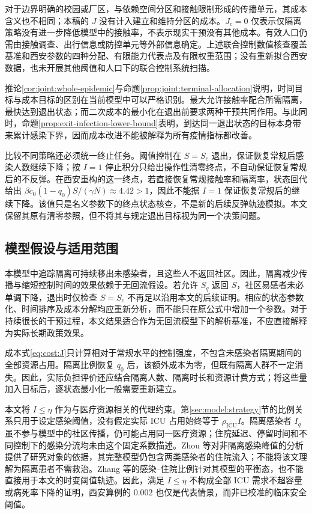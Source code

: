 \documentclass[lang=cn,a4paper,newtx]{elegantpaper}
\numberwithin{equation}{section}
\theoremstyle{plain}
\begin{document}
对于边界明确的校园或厂区，与依赖空间分区和接触限制形成的传播单元，其成本含义也不相同；本稿的 $J$ 没有计入建立和维持分区的成本。$J_c=0$ 仅表示仅隔离策略没有进一步降低模型中的接触率，不表示现实干预没有其他成本。有效人口仍需由接触调查、出行信息或防控单元等外部信息确定。上述联合控制数值核查覆盖基准和西安参数的四种分配、有限能力代表点及有限权重范围；没有重新拟合西安数据，也未开展其他阈值和人口下的联合控制系统扫描。

推论\ref{cor:joint:whole-epidemic}与命题\ref{prop:joint:terminal-allocation}说明，时间目标与成本目标的区别在当前模型中可以严格识别。最大允许接触率配合所需隔离，最快达到退出状态；而二次成本的最小化在退出前要求两种干预共同作用。与此同时，命题\ref{prop:exit-infection-lower-bound}表明，到达同一退出状态的目标本身带来累计感染下界，因而成本改进不能被解释为所有疫情指标都改善。

比较不同策略还必须统一终止任务。阈值控制在 $S=S_c$ 退出，保证恢复常规后感染人数继续下降；按 $I=1$ 停止积分只给出操作性清零终点，不自动保证恢复常规后的不反弹。在西安重构的这一终点，若直接恢复常规接触率和隔离率，状态回代给出 $\beta c_0(1-q_0)S/(\gamma N)\approx4.42>1$，因此不能据 $I=1$ 保证恢复常规后的继续下降。该值只是名义参数下的终点状态核查，不是新的后续反弹轨迹模拟。本文保留其原有清零参照，但不将其与规定退出目标视为同一个决策问题。

\subsection{模型假设与适用范围}
本模型中追踪隔离可持续移出未感染者，且这些人不返回社区。因此，隔离减少传播与缩短控制时间的效果依赖于无回流假设。若允许 $S_q$ 返回 $S$，社区易感者未必单调下降，退出时仅检查 $S=S_c$ 不再足以沿用本文的后续证明。相应的状态参数化、时间排序及成本分解均应重新分析，而不能只在原公式中增加一个参数。对于持续很长的干预过程，本文结果适合作为无回流模型下的解析基准，不应直接解释为实际长期政策效果。

成本式\eqref{eq:cost:J}只计算相对于常规水平的控制强度，不包含未感染者隔离期间的全部资源占用。隔离比例恢复 $q_0$ 后，该额外成本为零，但既有隔离人群不一定消失。因此，实际负担评价还应结合隔离人数、隔离时长和资源计费方式；将这些量加入目标后，逐状态最小化一般需要重新建立。

本文将 $I\le\eta$ 作为与医疗资源相关的代理约束。第\ref{sec:model:strategy}节的比例关系只用于设定感染阈值，没有假定实际 ICU 占用始终等于 $\rho_{\mathrm{ICU}}I$。隔离感染者 $I_q$ 虽不参与模型中的社区传播，仍可能占用同一医疗资源；住院延迟、停留时间和不同控制下的感染分流均未由这个固定系数描述。Zhou 等\cite{Zhou2024SPCI}对非隔离感染峰值的分析提供了研究对象的依据，其完整模型仍包含两类感染者的住院流入；不能将该文理解为隔离患者不需救治。Zhang 等\cite[注记1]{Zhang2026Behavior}的感染--住院比例针对其模型的平衡态，也不能直接用于本文的时变阈值轨迹。因此，满足 $I\le\eta$ 不构成全部 ICU 需求不超容量或病死率下降的证明，西安算例的 $0.002$ 也仅是代表情景，而非已校准的临床安全阈值。
\end{document}
